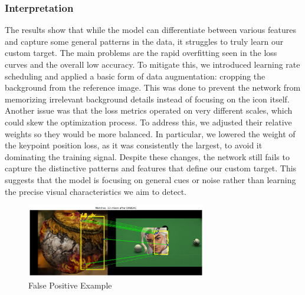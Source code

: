 \subsubsection{Interpretation}
The results show that while the model can differentiate between various
features and capture some general patterns in the data, it struggles to truly
learn our custom target. The main problems are the rapid overfitting seen in
the loss curves and the overall low accuracy. To mitigate this, we introduced
learning rate scheduling and applied a basic form of data augmentation:
cropping the background from the reference image. This was done to prevent the
network from memorizing irrelevant background details instead of focusing on
the icon itself. Another issue was that the loss metrics operated on very
different scales, which could skew the optimization process. To address this,
we adjusted their relative weights so they would be more balanced. In
particular, we lowered the weight of the keypoint position loss, as it was
consistently the largest, to avoid it dominating the training signal. Despite
these changes, the network still fails to capture the distinctive patterns and
features that define our custom target. This suggests that the model is
focusing on general cues or noise rather than learning the precise visual
characteristics we aim to detect.
\begin{figure}[H]
    \centering
    \includegraphics[width=0.7\textwidth]{ressources/false_positive_1.png}
    \caption{False Positive Example}
    \label{fig:false_positive_1}
\end{figure}

